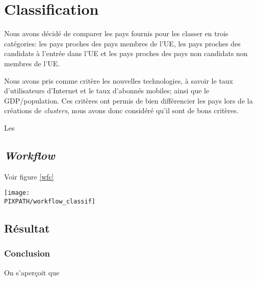 \vfil
\pagebreak
\section{Classification}

Nous avons décidé de comparer les pays fournis pour
les classer en trois catégories: les pays proches des pays
membres de l'UE, les pays proches des candidats à l'entrée
dans l'UE et les pays proches des pays non candidats non
membres de l'UE.

Nous avons pris comme critère les nouvelles technologies, à savoir
le taux d'utilisateurs d'Internet et le taux d'abonnés mobiles; ainsi
que le GDP/population.
Ces critères ont permis de bien différencier les pays lors de la
créations de {\sl clusters}, nous avons donc considéré qu'il
sont de bons critères.

Les 

\subsection{{\sl Workflow}}
Voir figure \ref{wfc}

\begin{sidewaysfigure}[!h]
\begin{center}
    \caption{{\sl Workflow} classification}
    \texttt{[image: \\PIXPATH/workflow\_classif]}
\label{wfc}
\end{center}
\end{sidewaysfigure}


\subsection{Résultat}



\subsubsection{Conclusion}

On s'aperçoit que 
